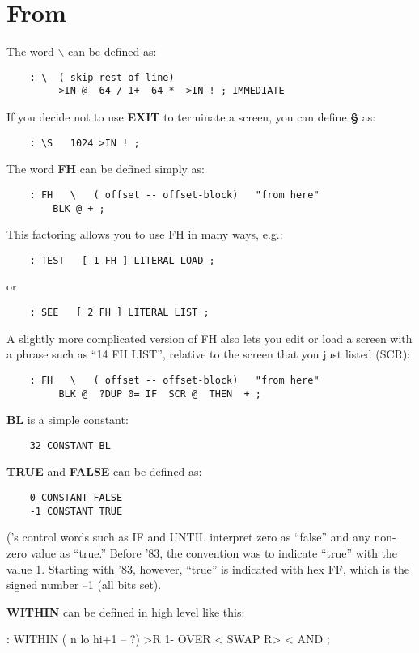 \section{From }
The word {\bf $\backslash$} can be defined as:
\begin{verbatim}
    : \  ( skip rest of line)
         >IN @  64 / 1+  64 *  >IN ! ; IMMEDIATE
\end{verbatim}
If you decide not to use {\bf EXIT} to terminate a screen, you can define {\bf \S}
as:
\begin{verbatim}
    : \S   1024 >IN ! ;
\end{verbatim}
The word {\bf FH} can be defined simply as:
\begin{verbatim}
    : FH   \   ( offset -- offset-block)   "from here"
        BLK @ + ;
\end{verbatim}
This factoring allows you to use FH in many ways, e.g.:
\begin{verbatim}
    : TEST   [ 1 FH ] LITERAL LOAD ;
\end{verbatim}
or
\begin{verbatim}
    : SEE   [ 2 FH ] LITERAL LIST ;
\end{verbatim}
A slightly more complicated version of FH also lets you edit or load a 
screen with a phrase such as ``14 FH LIST'', relative to the screen that 
you just listed (SCR):
\begin{verbatim}
    : FH   \   ( offset -- offset-block)   "from here"
         BLK @  ?DUP 0= IF  SCR @  THEN  + ;
\end{verbatim}
{\bf BL} is a simple constant:
\begin{verbatim}
    32 CONSTANT BL
\end{verbatim}
{\bf TRUE} and {\bf FALSE} can be defined as:
\begin{verbatim}
    0 CONSTANT FALSE
    -1 CONSTANT TRUE
\end{verbatim}
(\Forth{}'s control words such as IF and UNTIL interpret zero as ``false'' 
and any non-zero value as ``true.''  Before \Forth{} '83, the convention
was to indicate ``true'' with the value 1.  Starting with \Forth{} '83,
however, ``true'' is indicated with hex FF, which is the signed number --1
(all bits set).

{\bf WITHIN} can be defined in high level like this:
\begin{Code}
    : WITHIN  ( n lo hi+1 -- ?)
         >R  1- OVER <  SWAP R>  < AND ;
\end{Code}

